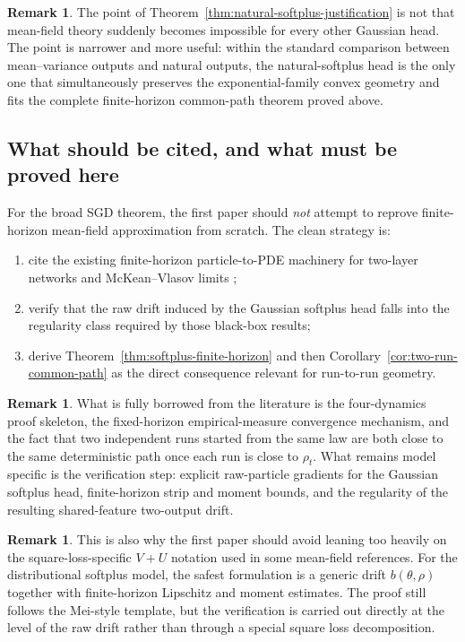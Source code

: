 \documentclass[11pt]{article}
\theoremstyle{definition}
\newtheorem{remark}[theorem]{Remark}
\begin{document}
\begin{remark}
The point of Theorem~\ref{thm:natural-softplus-justification} is not that
mean-field theory suddenly becomes impossible for every other Gaussian head. The
point is narrower and more useful: within the standard comparison between
mean--variance outputs and natural outputs, the natural-softplus head is the
only one that simultaneously preserves the exponential-family convex geometry
and fits the complete finite-horizon common-path theorem proved above.
\end{remark}

\subsection{What should be cited, and what must be proved here}

For the broad SGD theorem, the first paper should \emph{not} attempt to reprove
finite-horizon mean-field approximation from scratch. The clean strategy is:
\begin{enumerate}[label=(C\arabic*)]
  \item cite the existing finite-horizon particle-to-PDE machinery for
  two-layer networks and McKean--Vlasov limits
  \cite{MeiMisiakiewiczMontanari2019,SirignanoSpiliopoulos2020};
  \item verify that the raw drift induced by the Gaussian softplus head falls
  into the regularity class required by those black-box results;
  \item derive Theorem~\ref{thm:softplus-finite-horizon} and then
  Corollary~\ref{cor:two-run-common-path} as the direct consequence relevant for
  run-to-run geometry.
\end{enumerate}

\begin{remark}
What is fully borrowed from the literature is the four-dynamics proof skeleton,
the fixed-horizon empirical-measure convergence mechanism, and the fact that
two independent runs started from the same law are both close to the same
deterministic path once each run is close to $\rho_t$. What remains model
specific is the verification step: explicit raw-particle gradients for the
Gaussian softplus head, finite-horizon strip and moment bounds, and the
regularity of the resulting shared-feature two-output drift.
\end{remark}

\begin{remark}
This is also why the first paper should avoid leaning too heavily on the
square-loss-specific $V+U$ notation used in some mean-field references. For the
distributional softplus model, the safest formulation is a generic drift
$b(\theta,\rho)$ together with finite-horizon Lipschitz and moment estimates.
The proof still follows the Mei-style template, but the verification is carried
out directly at the level of the raw drift rather than through a special square
loss decomposition.
\end{remark}
\end{document}
